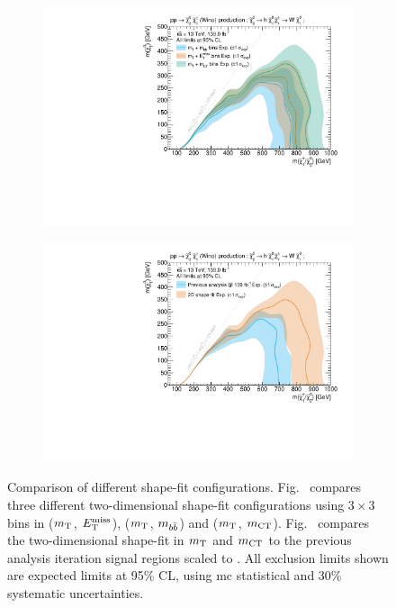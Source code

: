  \begin{figure}
	\centering
	\begin{subfigure}[b]{0.5\linewidth}
		\centering\includegraphics[width=1.0\textwidth]{HF/plot_binnings}
		\caption{\label{fig:plot_binnings}}
	\end{subfigure}\hfill
	\begin{subfigure}[b]{0.5\linewidth}
		\centering\includegraphics[width=1.0\textwidth]{HF/plot_2d_shapefit}
		\caption{\label{fig:previous_analysis_comparison}}
	\end{subfigure}\hfill

	\caption{Comparison of different shape-fit configurations. Fig.~ compares three different two-dimensional shape-fit configurations using $3\times 3$ bins in ($m_{\textrm{T}}$, $E_{\textrm{T}}^{\textrm{miss}}$), ($m_{\textrm{T}}$, $m_{b\bar{b}}$) and ($m_{\textrm{T}}$, $m_{\textrm{CT}}$). Fig.~ compares the two-dimensional shape-fit in $m_{\textrm{T}}$ and $m_{\textrm{CT}}$ to the previous analysis iteration signal regions scaled to \onethirtynineifb. All exclusion limits shown are expected limits at 95\% CL, using \gls{mc} statistical and 30\% systematic uncertainties.}
	\label{fig:results_HF_scans}
\end{figure}


